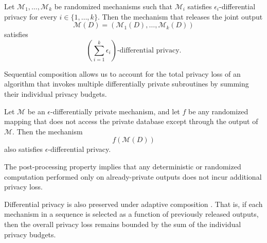 \begin{theorem}
Let $\mathcal{M}_1,\ldots,\mathcal{M}_k$ be randomized mechanisms such that
$\mathcal{M}_i$ satisfies $\epsilon_i$-differential privacy for every
$i \in \{1,\ldots,k\}$.
Then the mechanism that releases the joint output
\[
\mathcal{M}(D)
=
\left(
\mathcal{M}_1(D),
\ldots,
\mathcal{M}_k(D)
\right)
\]
satisfies
\[
\left(\sum_{i=1}^{k}\epsilon_i\right)
\text{-differential privacy}.
\]
\end{theorem}

Sequential composition allows us to account for the total privacy loss of an algorithm
that invokes multiple differentially private subroutines by summing their individual
privacy budgets.

\begin{theorem}
Let $\mathcal{M}$ be an $\epsilon$-differentially private mechanism,
and let $f$ be any randomized mapping that does not access the private database
except through the output of $\mathcal{M}$.
Then the mechanism
\[
f(\mathcal{M}(D))
\]
also satisfies $\epsilon$-differential privacy.
\end{theorem}

The post-processing property implies that any deterministic or randomized computation
performed only on already-private outputs does not incur additional privacy loss.

Differential privacy is also preserved under adaptive composition
\cite{mcsherry2009,li2016}.
That is, if each mechanism in a sequence is selected as a function
of previously released outputs, then the overall privacy loss remains
bounded by the sum of the individual privacy budgets.
